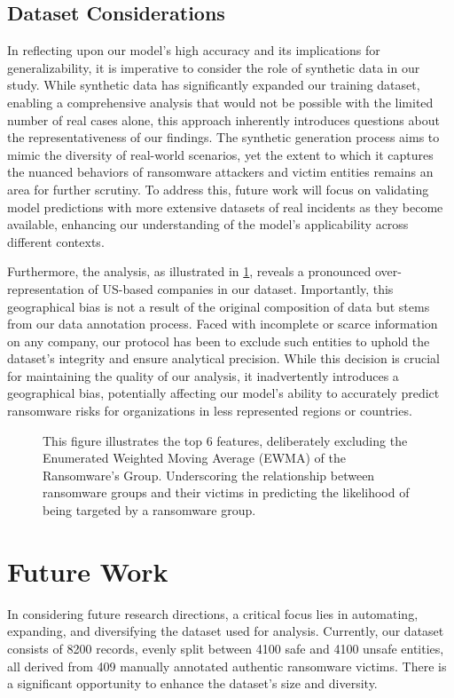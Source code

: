 \documentclass[running heads]{llncs}
\begin{document}
\subsection{Dataset Considerations}

In reflecting upon our model's high accuracy and its implications for generalizability, it is imperative to consider the role of synthetic data in our study. While synthetic data has significantly expanded our training dataset, enabling a comprehensive analysis that would not be possible with the limited number of real cases alone, this approach inherently introduces questions about the representativeness of our findings. The synthetic generation process aims to mimic the diversity of real-world scenarios, yet the extent to which it captures the nuanced behaviors of ransomware attackers and victim entities remains an area for further scrutiny. To address this, future work will focus on validating model predictions with more extensive datasets of real incidents as they become available, enhancing our understanding of the model's applicability across different contexts.

Furthermore, the analysis, as illustrated in \ref{fig:feature_importance}, reveals a pronounced over-representation of US-based companies in our dataset. Importantly, this geographical bias is not a result of the original composition of data but stems from our data annotation process. Faced with incomplete or scarce information on any company, our protocol has been to exclude such entities to uphold the dataset's integrity and ensure analytical precision. While this decision is crucial for maintaining the quality of our analysis, it inadvertently introduces a geographical bias, potentially affecting our model's ability to accurately predict ransomware risks for organizations in less represented regions or countries.

\begin{figure}
  \captionsetup{
    belowskip=-8pt,
  }
  \centering
  \caption[Ransomware Prediction Feature Importance]{This figure illustrates the top 6 features, deliberately excluding the Enumerated Weighted Moving Average (EWMA) of the Ransomware's Group. Underscoring the relationship between ransomware groups and their victims in predicting the likelihood of being targeted by a ransomware group. }
  \label{fig:feature_importance}
\end{figure}


\section{Future Work}
\label{sec:futurework}
In considering future research directions, a critical focus lies in automating, expanding, and diversifying the dataset used for analysis. Currently, our dataset consists of 8200 records, evenly split between 4100 safe and 4100 unsafe entities, all derived from 409 manually annotated authentic ransomware victims. There is a significant opportunity to enhance the dataset's size and diversity.
\end{document}
